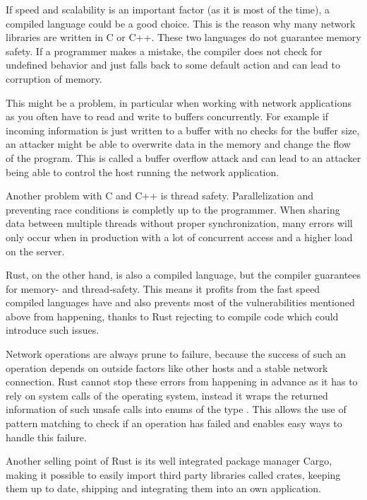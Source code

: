 If speed and scalability is an important factor (as it is most of the time), a compiled language could be a good choice.
This is the reason why many network libraries are written in C or C++. These two languages do not guarantee memory
safety. If a programmer makes a mistake, the compiler does not check for undefined behavior and just falls back to some
default action and can lead to corruption of memory.

This might be a problem, in particular when working with network applications as you often have to read and write to
buffers concurrently. For example if incoming information is just written to a buffer with no checks for the buffer
size, an attacker might be able to overwrite data in the memory and change the flow of the program. This is called a
buffer overflow attack and can lead to an attacker being able to control the host running the network application.
\cite{c00buffer}

Another problem with C and C++ is thread safety. Parallelization and preventing race conditions is completly up to the
programmer. When sharing data between multiple threads without proper synchronization, many errors will only occur when
in production with a lot of concurrent access and a higher load on the server.

Rust, on the other hand, is also a compiled language, but the compiler guarantees for memory- and thread-safety. This
means it profits from the fast speed compiled languages have and also prevents most of the vulnerabilities mentioned
above from happening, thanks to Rust rejecting to compile code which could introduce such issues.

Network operations are always prune to failure, because the success of such an operation depends on outside factors
like other hosts and a stable network connection. Rust cannot stop these errors from happening in advance as it has to
rely on system calls of the operating system, instead it wraps the returned information of such unsafe calls into
enums of the type . This allows the use of pattern matching to check if an operation has
failed and enables easy ways to handle this failure.

Another selling point of Rust is its well integrated package manager Cargo, making it possible to easily import third
party libraries called crates, keeping them up to date, shipping and integrating them into an own application.

